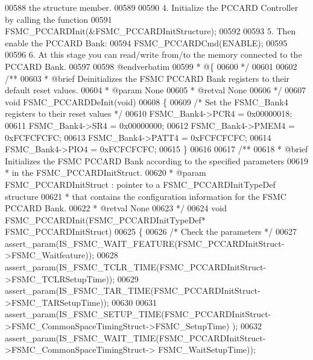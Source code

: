 \begin{DoxyCode}
00588 \textcolor{comment}{      the structure member.}
00589 \textcolor{comment}{      }
00590 \textcolor{comment}{   4. Initialize the PCCARD Controller by calling the function}
00591 \textcolor{comment}{          FSMC\_PCCARDInit(&FSMC\_PCCARDInitStructure); }
00592 \textcolor{comment}{}
00593 \textcolor{comment}{   5. Then enable the PCCARD Bank:}
00594 \textcolor{comment}{          FSMC\_PCCARDCmd(ENABLE);  }
00595 \textcolor{comment}{}
00596 \textcolor{comment}{   6. At this stage you can read/write from/to the memory connected to the PCCARD Bank. }
00597 \textcolor{comment}{ }
00598 \textcolor{comment}{@endverbatim}
00599 \textcolor{comment}{  * @\{}
00600 \textcolor{comment}{  */}
00601 
00602 \textcolor{comment}{/**}
00603 \textcolor{comment}{  * @brief  Deinitializes the FSMC PCCARD Bank registers to their default reset values.}
00604 \textcolor{comment}{  * @param  None                       }
00605 \textcolor{comment}{  * @retval None}
00606 \textcolor{comment}{  */}
00607 \textcolor{keywordtype}{void} FSMC_PCCARDDeInit(\textcolor{keywordtype}{void})
00608 \{
00609   \textcolor{comment}{/* Set the FSMC\_Bank4 registers to their reset values */}
00610   FSMC_Bank4->PCR4 = 0x00000018;
00611   FSMC_Bank4->SR4 = 0x00000000;
00612   FSMC_Bank4->PMEM4 = 0xFCFCFCFC;
00613   FSMC_Bank4->PATT4 = 0xFCFCFCFC;
00614   FSMC_Bank4->PIO4 = 0xFCFCFCFC;
00615 \}
00616 
00617 \textcolor{comment}{/**}
00618 \textcolor{comment}{  * @brief  Initializes the FSMC PCCARD Bank according to the specified parameters}
00619 \textcolor{comment}{  *         in the FSMC\_PCCARDInitStruct.}
00620 \textcolor{comment}{  * @param  FSMC\_PCCARDInitStruct : pointer to a FSMC\_PCCARDInitTypeDef structure}
00621 \textcolor{comment}{  *         that contains the configuration information for the FSMC PCCARD Bank.                     
        }
00622 \textcolor{comment}{  * @retval None}
00623 \textcolor{comment}{  */}
00624 \textcolor{keywordtype}{void} FSMC_PCCARDInit(FSMC\_PCCARDInitTypeDef* FSMC\_PCCARDInitStruct)
00625 \{
00626   \textcolor{comment}{/* Check the parameters */}
00627   assert_param(IS\_FSMC\_WAIT\_FEATURE(FSMC\_PCCARDInitStruct->FSMC\_Waitfeature));
00628   assert_param(IS\_FSMC\_TCLR\_TIME(FSMC\_PCCARDInitStruct->FSMC\_TCLRSetupTime));
00629   assert_param(IS\_FSMC\_TAR\_TIME(FSMC\_PCCARDInitStruct->FSMC\_TARSetupTime));
00630 
00631   assert_param(IS\_FSMC\_SETUP\_TIME(FSMC\_PCCARDInitStruct->FSMC\_CommonSpaceTimingStruct->FSMC\_SetupTime)
      );
00632   assert_param(IS\_FSMC\_WAIT\_TIME(FSMC\_PCCARDInitStruct->FSMC\_CommonSpaceTimingStruct->
      FSMC\_WaitSetupTime));

\end{DoxyCode}
